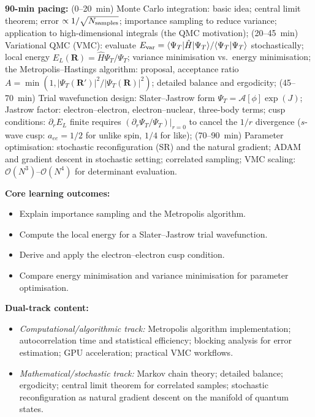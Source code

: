 \documentclass[11pt,a4paper]{article}
\begin{document}
\begin{tcolorbox}[modulebox, title={Module~II.1 --- Lecture L05: Quantum Monte Carlo I --- Variational QMC}]
\textbf{90-min pacing:} (0--20~min) Monte Carlo integration: basic idea; central limit theorem;
error $\propto 1/\sqrt{N_{\rm samples}}$; importance sampling to reduce variance;
application to high-dimensional integrals (the QMC motivation);
(20--45~min) Variational QMC (VMC): evaluate $E_{\rm var}=\langle\Psi_T|\hat{H}|\Psi_T\rangle/
\langle\Psi_T|\Psi_T\rangle$ stochastically; local energy $E_L(\mathbf{R})=\hat{H}\Psi_T/\Psi_T$;
variance minimisation vs.\ energy minimisation;
the Metropolis--Hastings algorithm: proposal, acceptance ratio
$A=\min(1,|\Psi_T(\mathbf{R}')|^2/|\Psi_T(\mathbf{R})|^2)$;
detailed balance and ergodicity;
(45--70~min) Trial wavefunction design: Slater--Jastrow form
$\Psi_T=\mathcal{A}[\phi]\exp(J)$;
Jastrow factor: electron--electron, electron--nuclear, three-body terms;
cusp conditions: $\partial_r E_L$ finite requires $(\partial_r\Psi_T/\Psi_T)|_{r=0}$ to
cancel the $1/r$ divergence ($s$-wave cusp: $a_{ee}=1/2$ for unlike spin, $1/4$ for like);
(70--90~min) Parameter optimisation: stochastic reconfiguration (SR) and the natural
gradient; ADAM and gradient descent in stochastic setting; correlated sampling;
VMC scaling: $\mathcal{O}(N^3)$--$\mathcal{O}(N^4)$ for determinant evaluation.

\medskip\textbf{Core learning outcomes:}
\begin{itemize}[leftmargin=1.4em,topsep=2pt,itemsep=1pt]
  \item Explain importance sampling and the Metropolis algorithm.
  \item Compute the local energy for a Slater--Jastrow trial wavefunction.
  \item Derive and apply the electron--electron cusp condition.
  \item Compare energy minimisation and variance minimisation for parameter optimisation.
\end{itemize}

\medskip\textbf{Dual-track content:}
\begin{itemize}[leftmargin=1.4em,topsep=2pt,itemsep=1pt]
  \item \textit{Computational/algorithmic track:} Metropolis algorithm implementation;
    autocorrelation time and statistical efficiency; blocking analysis for error estimation;
    GPU acceleration; practical VMC workflows.
  \item \textit{Mathematical/stochastic track:} Markov chain theory; detailed balance;
    ergodicity; central limit theorem for correlated samples; stochastic reconfiguration
    as natural gradient descent on the manifold of quantum states.
\end{itemize}


\end{tcolorbox}
\end{document}
